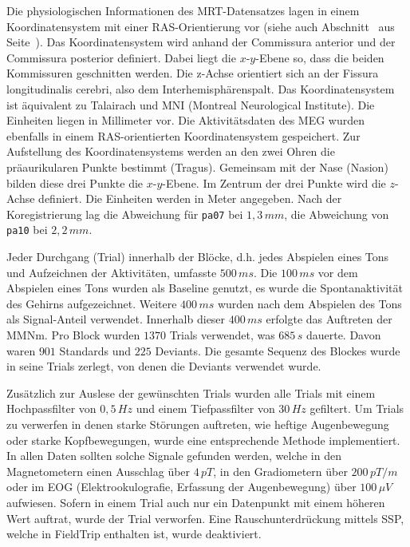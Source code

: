 \documentclass[doc,a4paper,12pt]{apa6}
\makeatletter
\DeclareRobustCommand*{\nameref}[1]{%
      \glqq{\myorg@nameref{#1}}\grqq%
    }%
\makeatother
\begin{document}
Die physiologischen Informationen des MRT-Datensatzes lagen in einem Koordinatensystem mit einer RAS-Orientierung vor (siehe auch Abschnitt~\nameref{sec:coreg} aus Seite~\pageref{sec:coreg}). Das Koordinatensystem wird anhand der Commissura anterior und der Commissura posterior definiert. Dabei liegt die $x$-$y$-Ebene so, dass die beiden Kommissuren geschnitten werden. Die z-Achse orientiert sich an der Fissura longitudinalis cerebri, also dem Interhemisphärenspalt. Das Koordinatensystem ist äquivalent zu Talairach und MNI (Montreal Neurological Institute). Die Einheiten liegen in Millimeter vor. Die Aktivitätsdaten des MEG wurden ebenfalls in einem RAS-orientierten Koordinatensystem gespeichert. Zur Aufstellung des Koordinatensystems werden an den zwei Ohren die präaurikularen Punkte bestimmt (Tragus). Gemeinsam mit der Nase (Nasion) bilden diese drei Punkte die $x$-$y$-Ebene. Im Zentrum der drei Punkte wird die $z$-Achse definiert. Die Einheiten werden in Meter angegeben. Nach der Koregistrierung lag die Abweichung für \texttt{pa07} bei $1,3\,mm$, die Abweichung von \texttt{pa10} bei $2,2\,mm$.

Jeder Durchgang (Trial) innerhalb der Blöcke, d.h. jedes Abspielen eines Tons und Aufzeichnen der Aktivitäten, umfasste $500\,ms$. Die $100\,ms$ vor dem Abspielen eines Tons wurden als Baseline genutzt, es wurde die Spontanaktivität des Gehirns aufgezeichnet. Weitere $400\,ms$ wurden nach dem Abspielen des Tons als Signal-Anteil verwendet. Innerhalb dieser $400\,ms$ erfolgte das Auftreten der MMNm. Pro Block wurden $1370$ Trials verwendet, was $685\,s$ dauerte. Davon waren $901$ Standards und $225$ Deviants. Die gesamte Sequenz des Blockes wurde in seine Trials zerlegt, von denen die Deviants verwendet wurde.

Zusätzlich zur Auslese der gewünschten Trials wurden alle Trials mit einem Hochpassfilter von $0,5\,Hz$ und einem Tiefpassfilter von $30\,Hz$ gefiltert. Um Trials zu verwerfen in denen starke Störungen auftreten, wie heftige Augenbewegung oder starke Kopfbewegungen, wurde eine entsprechende Methode implementiert. In allen Daten sollten solche Signale gefunden werden, welche in den Magnetometern einen Ausschlag über $4\,pT$, in den Gradiometern über $200\,pT/m$ oder im EOG (Elektrookulografie, Erfassung der Augenbewegung) über $100\,\mu V$ aufwiesen. Sofern in einem Trial auch nur ein Datenpunkt mit einem höheren Wert auftrat, wurde der Trial verworfen. Eine Rauschunterdrückung mittels SSP, welche in FieldTrip enthalten ist, wurde deaktiviert.
\end{document}
